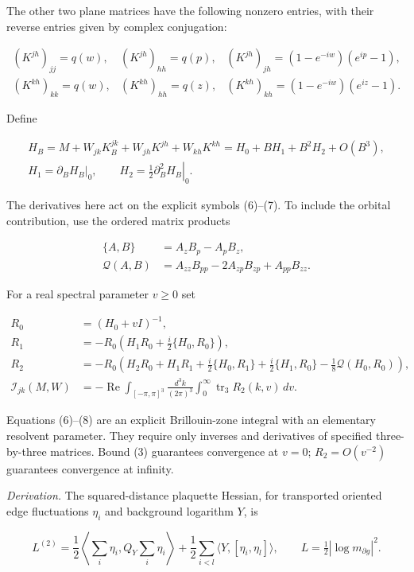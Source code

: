 \documentclass[11pt,a4paper]{article}
\begin{document}
The other two plane matrices have the following nonzero entries, with
their reverse entries given by complex conjugation:

\[\begin{array}{lll}
 (K^{jh})_{jj}=q(w),& (K^{jh})_{hh}=q(p),&
 (K^{jh})_{jh}=(1-e^{-iw})(e^{ip}-1),\\
 (K^{kh})_{kk}=q(w),& (K^{kh})_{hh}=q(z),&
 (K^{kh})_{kh}=(1-e^{-iw})(e^{iz}-1).
\end{array}\tag{7}\]

Define

\[\begin{gathered}
 H_B=M+W_{jk}K^{jk}_B+W_{jh}K^{jh}+W_{kh}K^{kh}
       =H_0+BH_1+B^2H_2+O(B^3),\\
 H_1=\left.\partial_BH_B\right|_0,\qquad
 H_2=\left.\tfrac12\partial_B^2H_B\right|_0.
\end{gathered}\]

The derivatives here act on the explicit symbols (6)--(7). To include
the orbital contribution, use the ordered matrix products

\[\begin{aligned}
 \{A,B\}&=A_zB_p-A_pB_z,\\
 \mathcal Q(A,B)&=A_{zz}B_{pp}-2A_{zp}B_{zp}+A_{pp}B_{zz}.
\end{aligned}\]

For a real spectral parameter \(v\ge0\) set

\[\begin{aligned}
 R_0&=(H_0+vI)^{-1},\\
 R_1&=-R_0\left(H_1R_0+\frac i2\{H_0,R_0\}\right),\\
 R_2&=-R_0\left(H_2R_0+H_1R_1
 +\frac i2\{H_0,R_1\}+\frac i2\{H_1,R_0\}
 -\frac18\mathcal Q(H_0,R_0)\right),\\
 \mathcal I_{jk}(M,W)&=-\operatorname{Re}\int_{[-\pi,\pi]^3}
 \frac{d^3k}{(2\pi)^3}\int_0^\infty\operatorname{tr}_3 R_2(k,v)\,dv.
\end{aligned}\tag{8}\]

Equations (6)--(8) are an explicit Brillouin-zone integral with an
elementary resolvent parameter. They require only inverses and
derivatives of specified three-by-three matrices. Bound (3) guarantees
convergence at \(v=0\); \(R_2=O(v^{-2})\) guarantees convergence at
infinity.

\emph{Derivation.} The squared-distance plaquette Hessian, for
transported oriented edge fluctuations \(\eta_i\) and background
logarithm \(Y\), is

\[L^{(2)}=\frac12\left\langle\sum_i\eta_i,Q_Y\sum_i\eta_i\right\rangle
 +\frac12\sum_{i<l}\langle Y,[\eta_i,\eta_l]\rangle,
 \qquad L=\tfrac12|\log m_{\partial g}|^2.\tag{9}\]
\end{document}
